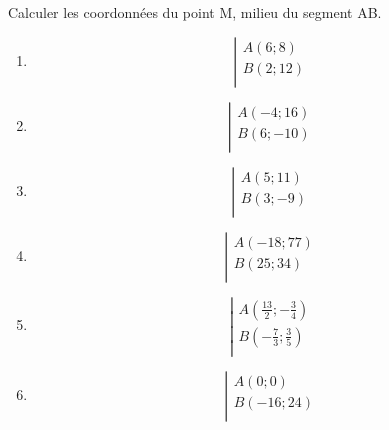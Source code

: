 \begin{exercice}
Calculer les coordonnées du point M, milieu du segment AB.
\begin{multicols}{2}
\begin{enumerate}
\item $$\left| \begin{array}{l}
 A\left( 6;8 \right) \\ 
B\left( 2;12 \right) \\ 
\end{array} \right.$$
\item $$\left| \begin{array}{l}
 A\left( -4;16 \right) \\ 
B\left( 6;-10 \right) \\ 
\end{array} \right.$$
\item $$\left| \begin{array}{l}
 A\left( 5;11 \right) \\ 
B\left( 3;-9 \right) \\ 
\end{array} \right.$$
\item $$\left| \begin{array}{l}
 A\left( -18;77 \right) \\ 
B\left( 25;34 \right) \\ 
\end{array} \right.$$
\item $$\left| \begin{array}{l}
 A\left( \frac{13}{2};-\frac{3}{4} \right) \\ 
B\left( -\frac{7}{3};\frac{3}{5} \right) \\ 
\end{array} \right.$$
\item $$\left| \begin{array}{l}
 A\left( 0;0 \right) \\ 
B\left( -16;24 \right) \\ 
\end{array} \right.$$
\end{enumerate}
\end{multicols}
\end{exercice}

